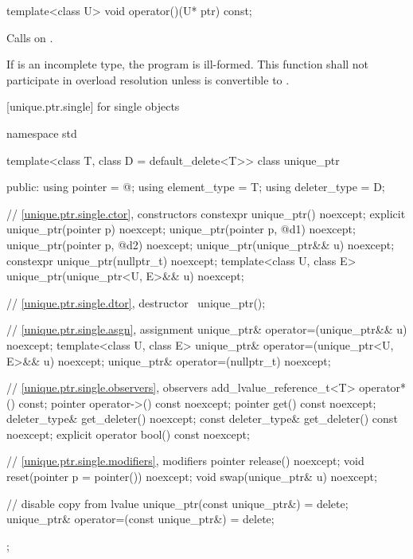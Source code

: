 %
\begin{itemdecl}
template<class U> void operator()(U* ptr) const;
\end{itemdecl}

\begin{itemdescr}
\pnum
\effects
Calls  on .

\pnum
\remarks
If  is an incomplete type, the program is ill-formed.
This function shall not participate in overload resolution
unless  is convertible to .
\end{itemdescr}

[unique.ptr.single]{ for single objects}

%
\begin{codeblock}
namespace std {
  template<class T, class D = default_delete<T>> class unique_ptr {
  public:
    using pointer      = @\seebelow@;
    using element_type = T;
    using deleter_type = D;

    // \ref{unique.ptr.single.ctor}, constructors
    constexpr unique_ptr() noexcept;
    explicit unique_ptr(pointer p) noexcept;
    unique_ptr(pointer p, @\seebelow@ d1) noexcept;
    unique_ptr(pointer p, @\seebelow@ d2) noexcept;
    unique_ptr(unique_ptr&& u) noexcept;
    constexpr unique_ptr(nullptr_t) noexcept;
    template<class U, class E>
      unique_ptr(unique_ptr<U, E>&& u) noexcept;

    // \ref{unique.ptr.single.dtor}, destructor
    ~unique_ptr();

    // \ref{unique.ptr.single.asgn}, assignment
    unique_ptr& operator=(unique_ptr&& u) noexcept;
    template<class U, class E>
      unique_ptr& operator=(unique_ptr<U, E>&& u) noexcept;
    unique_ptr& operator=(nullptr_t) noexcept;

    // \ref{unique.ptr.single.observers}, observers
    add_lvalue_reference_t<T> operator*() const;
    pointer operator->() const noexcept;
    pointer get() const noexcept;
    deleter_type& get_deleter() noexcept;
    const deleter_type& get_deleter() const noexcept;
    explicit operator bool() const noexcept;

    // \ref{unique.ptr.single.modifiers}, modifiers
    pointer release() noexcept;
    void reset(pointer p = pointer()) noexcept;
    void swap(unique_ptr& u) noexcept;

    // disable copy from lvalue
    unique_ptr(const unique_ptr&) = delete;
    unique_ptr& operator=(const unique_ptr&) = delete;
  };
}
\end{codeblock}

